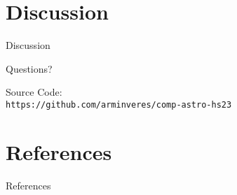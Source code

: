 \documentclass[
	9pt, %
]{beamer}
\begin{document}
\section{Discussion}
\begin{frame}[plain] %
	\begin{center}
		{\Huge Discussion}\bigskip\bigskip

		{\LARGE Questions?}\bigskip\bigskip

		Source Code: \\
		\texttt{https://github.com/arminveres/comp-astro-hs23}
	\end{center}
\end{frame}

\section{References}
\begin{frame}[allowframebreaks]{References}
	
	
	\nocite{*}
\end{frame}
\end{document}
